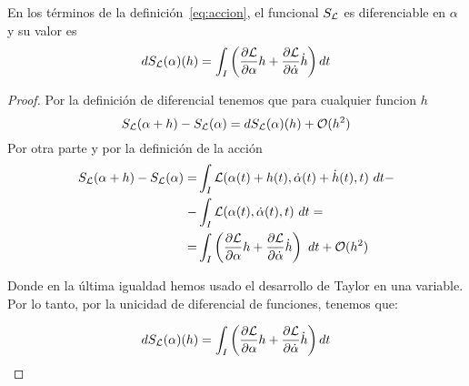 \begin{proposition}
	En los términos de la definición~\eqref{eq:accion}, el funcional $S_{\mathcal{L}}$ es diferenciable en $\alpha$ y su valor es
	\begin{equation}
		\label{eq:accion_diferencial}
		dS_{\mathcal{L}}(\alpha)(h)=\int_{I}\left( \frac{\partial \mathcal{L}}{\partial\alpha}h+\frac{\partial \mathcal{L}}{\partial\dot{\alpha}}\dot{h}\right) dt
	\end{equation}
\end{proposition}
\begin{proof}
	Por la definición de diferencial tenemos que para cualquier funcion $h$
	\begin{equation*}
		S_{\mathcal{L}}(\alpha + h) -  S_{\mathcal{L}}(\alpha) = dS_{\mathcal{L}}(\alpha)(h) +\mathcal{O}(h^2)
	\end{equation*}
	Por otra parte y por la definición de la acción
	\begin{equation*}
		\begin{split}
			S_\lagrangiano(\alpha + h) -  S_\lagrangiano(\alpha) = & \int_{I}\lagrangiano(\alpha(t)+h(t), \dot{\alpha}(t)+\dot{h}(t), t)\ dt - \\
			- & \int_{I}\lagrangiano(\alpha(t), \dot{\alpha}(t), t)\ dt =\\
			=& \int_{I}\left( \frac{\partial \lagrangiano}{\partial\alpha}h+\frac{\partial \lagrangiano}{\partial\dot{\alpha}}\dot{h}\right)\ dt+\mathcal{O}(h^2)
		\end{split}
	\end{equation*}

	Donde en la última igualdad hemos usado el desarrollo de Taylor en una variable.
	Por lo tanto, por la unicidad de diferencial de funciones, tenemos que:

	\begin{equation*}
		dS_{\mathcal{L}}(\alpha)(h) =\int_{I}\left( \frac{\partial \mathcal{L}}{\partial\alpha}h+\frac{\partial \mathcal{L}}{\partial\dot{\alpha}}\dot{h}\right) dt
	\end{equation*}

\end{proof}